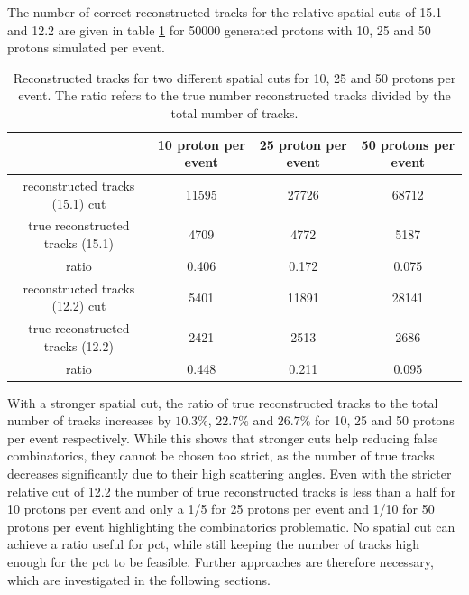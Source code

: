 The number of correct reconstructed tracks for the relative spatial cuts of 15.1 and 12.2 are given in table
\ref{tab:true_tracks} for 50000 generated protons with 10,
25 and 50 protons simulated per event.


\begin{table}
  \hspace{-1.5cm}
  \begin{tabular}{c | c c c}
    \toprule
     & 10 proton per event & 25 proton per event & 50 protons per event\\
    \midrule
    reconstructed tracks (15.1) cut & 11595 & 27726 & 68712  \\
    true reconstructed tracks (15.1) & 4709 & 4772  & 5187 \\
    ratio & 0.406 & 0.172 & 0.075 \\
    \midrule
    reconstructed tracks (12.2) cut & 5401 & 11891 & 28141 \\
    true reconstructed tracks (12.2) &  2421 &2513  & 2686 \\
    ratio & 0.448 & 0.211 & 0.095
  \end{tabular}
  \caption{Reconstructed tracks for two different spatial cuts for 10, 25 and 50 protons per event. The ratio refers to the true
  number reconstructed tracks divided by the total number of tracks.}
  \label{tab:true_tracks}
\end{table}

With a stronger spatial cut,  the ratio of true reconstructed tracks to
the total number of tracks increases by $10.3\%$, $22.7\%$ and $26.7\%$ for 10, 25 and 50 protons per event respectively.
While this shows that stronger cuts help reducing false combinatorics, they cannot be chosen too strict,
as the number of true tracks decreases significantly due to their high scattering angles. Even with the stricter relative cut of 12.2 the
number of true reconstructed tracks is less than a half for 10 protons per event and only a 1/5 for 25 protons per event and 1/10 for 50 protons per event highlighting
the combinatorics problematic. No spatial cut can achieve a ratio useful for pct, while still keeping the number
of tracks high enough for the pct to be feasible. Further approaches are therefore necessary, which are investigated in the following sections.

